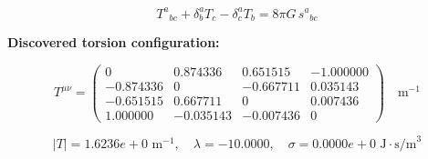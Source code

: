 
\begin{equation}
  T^a{}_{bc} + \delta^a_b T_c - \delta^a_c T_b = 8\pi G \, s^a{}_{bc}
\end{equation}

\textbf{Discovered torsion configuration:}

\begin{equation}
  T^{\mu\nu} = \begin{pmatrix}
    0 & 0.874336 & 0.651515 & -1.000000 \\
    -0.874336 & 0 & -0.667711 & 0.035143 \\
    -0.651515 & 0.667711 & 0 & 0.007436 \\
    1.000000 & -0.035143 & -0.007436 & 0
  \end{pmatrix} \quad \text{m}^{-1}
\end{equation}

\begin{equation}
  |T| = 1.6236e+0 \text{ m}^{-1}, \quad
  \lambda = -10.0000, \quad
  \sigma = 0.0000e+0 \text{ J}\cdot\text{s/m}^3
\end{equation}